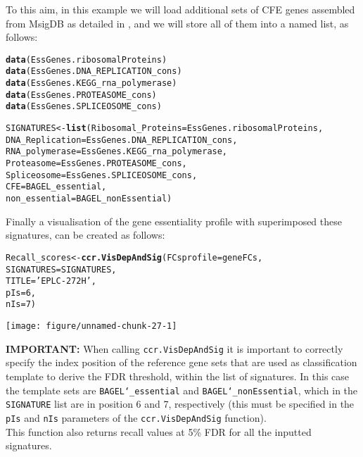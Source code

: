 \documentclass{article}\usepackage[]{graphicx}\usepackage[]{color}
\makeatletter
\def\maxwidth{ %
  \ifdim\Gin@nat@width>\linewidth
    \linewidth
  \else
    \Gin@nat@width
  \fi
}
\newcommand{\hlnum}[1]{\textcolor[rgb]{0.686,0.059,0.569}{#1}}%
\newcommand{\hlstr}[1]{\textcolor[rgb]{0.192,0.494,0.8}{#1}}%
\newcommand{\hlstd}[1]{\textcolor[rgb]{0.345,0.345,0.345}{#1}}%
\newcommand{\hlkwb}[1]{\textcolor[rgb]{0.69,0.353,0.396}{#1}}%
\newcommand{\hlkwc}[1]{\textcolor[rgb]{0.333,0.667,0.333}{#1}}%
\newcommand{\hlkwd}[1]{\textcolor[rgb]{0.737,0.353,0.396}{\textbf{#1}}}%
\newenvironment{kframe}{%
 \def\at@end@of@kframe{}%
 \ifinner\ifhmode%
  \def\at@end@of@kframe{\end{minipage}}%
  \begin{minipage}{\columnwidth}%
 \fi\fi%
 \def\FrameCommand##1{\hskip\@totalleftmargin \hskip-\fboxsep
 \colorbox{shadecolor}{##1}\hskip-\fboxsep
     \hskip-\linewidth \hskip-\@totalleftmargin \hskip\columnwidth}%
 \MakeFramed {\advance\hsize-\width
   \@totalleftmargin\z@ \linewidth\hsize
   \@setminipage}}%
 {\par\unskip\endMakeFramed%
 \at@end@of@kframe}
\newenvironment{knitrout}{}{} %
\makeatother
\begin{document}
To this aim, in this example we will load additional sets of CFE genes assembled from MsigDB \cite{Subramanian:2005wu} as detailed in \cite{Iorio:2017}, and we will store all of them into a named list, as follows:

\begin{knitrout}
\color{fgcolor}\begin{kframe}
\begin{alltt}
\hlkwd{data}\hlstd{(EssGenes.ribosomalProteins)}
\hlkwd{data}\hlstd{(EssGenes.DNA_REPLICATION_cons)}
\hlkwd{data}\hlstd{(EssGenes.KEGG_rna_polymerase)}
\hlkwd{data}\hlstd{(EssGenes.PROTEASOME_cons)}
\hlkwd{data}\hlstd{(EssGenes.SPLICEOSOME_cons)}

\hlstd{SIGNATURES}\hlkwb{<-}\hlkwd{list}\hlstd{(}\hlkwc{Ribosomal_Proteins}\hlstd{=EssGenes.ribosomalProteins,}
                 \hlkwc{DNA_Replication} \hlstd{= EssGenes.DNA_REPLICATION_cons,}
                 \hlkwc{RNA_polymerase} \hlstd{= EssGenes.KEGG_rna_polymerase,}
                 \hlkwc{Proteasome} \hlstd{= EssGenes.PROTEASOME_cons,}
                 \hlkwc{Spliceosome} \hlstd{= EssGenes.SPLICEOSOME_cons,}
                 \hlkwc{CFE} \hlstd{= BAGEL_essential,}
                 \hlkwc{non_essential} \hlstd{= BAGEL_nonEssential)}
\end{alltt}
\end{kframe}
\end{knitrout}
% 
Finally a visualisation of the gene essentiality profile with superimposed these signatures, can be created as follows:
 
\begin{knitrout}
\color{fgcolor}\begin{kframe}
\begin{alltt}
\hlstd{Recall_scores}\hlkwb{<-}\hlkwd{ccr.VisDepAndSig}\hlstd{(}\hlkwc{FCsprofile} \hlstd{= geneFCs,}
                             \hlkwc{SIGNATURES} \hlstd{= SIGNATURES,}
                             \hlkwc{TITLE} \hlstd{=} \hlstr{'EPLC-272H'}\hlstd{,}
                             \hlkwc{pIs} \hlstd{=} \hlnum{6}\hlstd{,}
                             \hlkwc{nIs} \hlstd{=} \hlnum{7}\hlstd{)}
\end{alltt}
\end{kframe}

{\centering \texttt{[image: figure/unnamed-chunk-27-1]} 

}



\end{knitrout}
% 
\textbf{IMPORTANT:} When calling \texttt{ccr.VisDepAndSig} it is important to correctly specify the index position of the reference gene sets that are used as classification template to derive the FDR threshold, within the list of signatures. In this case the template sets are \texttt{BAGEL\char`_essential} and \texttt{BAGEL\char`_nonEssential}, which in the \texttt{SIGNATURE} list are in position 6 and 7, respectively (this must be specified in the \texttt{pIs} and \texttt{nIs} parameters of the \texttt{ccr.VisDepAndSig} function).\\
% 
This function also returns recall values at 5\% FDR for all the inputted signatures.
\end{document}
